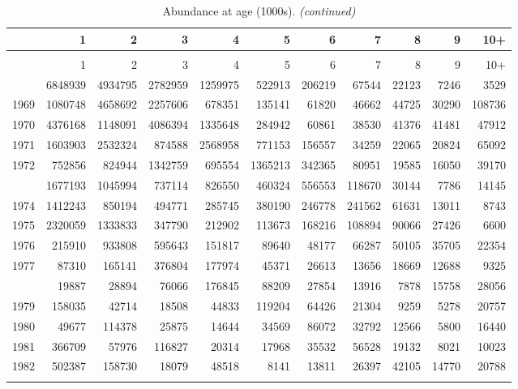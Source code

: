 \documentclass[
]{article}
\begin{document}
\begin{longtable}[t]{lrrrrrrrrrr}
\caption{\label{tab:NAA-table}Abundance at age (1000s).}\\
\toprule
  & 1 & 2 & 3 & 4 & 5 & 6 & 7 & 8 & 9 & 10+\\
\midrule
\endfirsthead
\caption[]{Abundance at age (1000s). \textit{(continued)}}\\
\toprule
  & 1 & 2 & 3 & 4 & 5 & 6 & 7 & 8 & 9 & 10+\\
\midrule
\endhead

\endfoot
\bottomrule
\endlastfoot
1968 & 6848939 & 4934795 & 2782959 & 1259975 & 522913 & 206219 & 67544 & 22123 & 7246 & 3529\\
1969 & 1080748 & 4658692 & 2257606 & 678351 & 135141 & 61820 & 46662 & 44725 & 30290 & 108736\\
1970 & 4376168 & 1148091 & 4086394 & 1335648 & 284942 & 60861 & 38530 & 41376 & 41481 & 47912\\
1971 & 1603903 & 2532324 & 874588 & 2568958 & 771153 & 156557 & 34259 & 22065 & 20824 & 65092\\
1972 & 752856 & 824944 & 1342759 & 695554 & 1365213 & 342365 & 80951 & 19585 & 16050 & 39170\\
\addlinespace
1973 & 1677193 & 1045994 & 737114 & 826550 & 460324 & 556553 & 118670 & 30144 & 7786 & 14145\\
1974 & 1412243 & 850194 & 494771 & 285745 & 380190 & 246778 & 241562 & 61631 & 13011 & 8743\\
1975 & 2320059 & 1333833 & 347790 & 212902 & 113673 & 168216 & 108894 & 90066 & 27426 & 6600\\
1976 & 215910 & 933808 & 595643 & 151817 & 89640 & 48177 & 66287 & 50105 & 35705 & 22354\\
1977 & 87310 & 165141 & 376804 & 177974 & 45371 & 26613 & 13656 & 18669 & 12688 & 9325\\
\addlinespace
1978 & 19887 & 28894 & 76066 & 176845 & 88209 & 27854 & 13916 & 7878 & 15758 & 28056\\
1979 & 158035 & 42714 & 18508 & 44833 & 119204 & 64426 & 21304 & 9259 & 5278 & 20757\\
1980 & 49677 & 114378 & 25875 & 14644 & 34569 & 86072 & 32792 & 12566 & 5800 & 16440\\
1981 & 366709 & 57976 & 116827 & 20314 & 17968 & 35532 & 56528 & 19132 & 8021 & 10023\\
1982 & 502387 & 158730 & 18079 & 48518 & 8141 & 13811 & 26397 & 42105 & 14770 & 20788\\
\addlinespace

\end{longtable}
\end{document}
